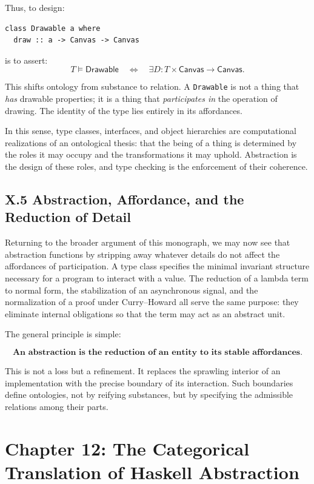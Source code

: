 \documentclass[12pt,letterpaper]{article}
\theoremstyle{remark}
\begin{document}
Thus, to design:
\begin{verbatim}
class Drawable a where
  draw :: a -> Canvas -> Canvas
\end{verbatim}
is to assert:
\[
T \vDash \mathsf{Drawable} 
\quad \iff \quad 
\exists D : T \times \mathsf{Canvas} \to \mathsf{Canvas}.
\]

This shifts ontology from substance to relation. A \texttt{Drawable} is not a thing that \emph{has} drawable properties; it is a thing that \emph{participates in} the operation of drawing. The identity of the type lies entirely in its affordances.

In this sense, type classes, interfaces, and object hierarchies are computational realizations of an ontological thesis: that the being of a thing is determined by the roles it may occupy and the transformations it may uphold. Abstraction is the design of these roles, and type checking is the enforcement of their coherence.

\subsection{X.5 Abstraction, Affordance, and the Reduction of Detail}

Returning to the broader argument of this monograph, we may now see that abstraction functions by stripping away whatever details do not affect the affordances of participation. A type class specifies the minimal invariant structure necessary for a program to interact with a value. The reduction of a lambda term to normal form, the stabilization of an asynchronous signal, and the normalization of a proof under Curry--Howard all serve the same purpose: they eliminate internal obligations so that the term may act as an abstract unit.

The general principle is simple:

\[
\textbf{An abstraction is the reduction of an entity to its stable affordances.}
\]

This is not a loss but a refinement. It replaces the sprawling interior of an implementation with the precise boundary of its interaction. Such boundaries define ontologies, not by reifying substances, but by specifying the admissible relations among their parts.

\newpage

\section{Chapter 12: The Categorical Translation of Haskell Abstraction}
\end{document}
